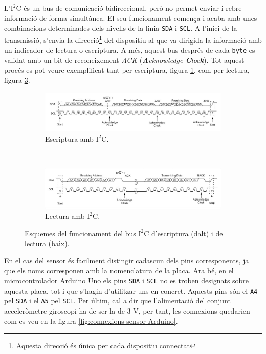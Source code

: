 \documentclass[12pt,a4paper,final,twoside]{report}
\begin{document}
L'$\mathrm{I^2C}$ és un bus de comunicació bidireccional, però no permet enviar i rebre informació de forma simultànea. El seu funcionament comença i acaba amb unes combinacions determinades dels nivells de la linia \texttt{SDA} i \texttt{SCL}. A l'inici de la transmissió, s'envia la direcció\footnote{Aquesta direcció és única per cada dispositiu connectat} del dispositiu al que va dirigida la informació amb un indicador de lectura o escriptura. A més, aquest bus després de cada \texttt{byte} es validat amb un bit de reconeixement \textit{ACK} (\textit{\textbf{A}cknowledge \textbf{C}loc\textbf{k}}). Tot aquest procés es pot veure exemplificat tant per escriptura, figura \ref{fig:i2c-write-transmission}, com per lectura, figura \ref{fig:i2c-read-transmission}.


\begin{figure}[tb]

\centering
\begin{subfigure}[b]{\textwidth}
\centering
\includegraphics[width=\textwidth]{Imatges/i2c-write-transmission.png}
\caption{Escriptura amb $\mathrm{I^2C}$.}
\label{fig:i2c-write-transmission}
\end{subfigure}
~
\begin{subfigure}[b]{\textwidth}
\centering
\includegraphics[width=\textwidth]{Imatges/i2c-read-transmission.png}
\caption{Lectura amb $\mathrm{I^2C}$.}
\label{fig:i2c-read-transmission}
\end{subfigure}
\caption{Esquemes del funcionament del bus $\mathrm{I^2C}$ d'escriptura (dalt) i de lectura (baix).}
\end{figure}

En el cas del sensor és facilment distingir cadascun dels pins corresponents, ja que els noms corresponen amb la nomenclatura de la placa. Ara bé, en el microcontrolador Arduino Uno els pins \texttt{SDA} i \texttt{SCL} no es troben designats sobre aquesta placa, tot i que s'hagin d'utilitzar uns en concret. Aquests pins són el \texttt{A4} pel \texttt{SDA} i el \texttt{A5} pel \texttt{SCL}. Per últim, cal a dir que l'alimentació del conjunt acceleròmetre-giroscopi ha de ser la de 3 V, per tant, les connexions quedarien com es veu en la figura \ref{fig:connexions-sensor-Arduino}. 
\end{document}
